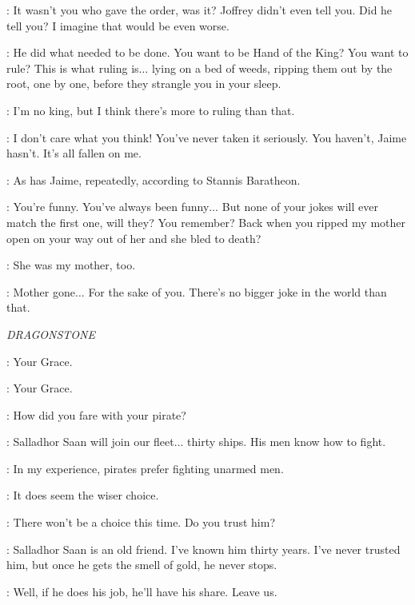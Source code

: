
\TYRION: It wasn't you who gave the order, was it? Joffrey didn't even tell you. Did he tell you? I imagine that would be even worse.

\CERSEI: He did what needed to be done. You want to be Hand of the King? You want to rule? This is what ruling is$\ldots$ lying on a bed of weeds, ripping them out by the root, one by one, before they strangle you in your sleep.

\TYRION: I'm no king, but I think there's more to ruling than that.

\CERSEI: I don't care what you think! You've never taken it seriously. You haven't, Jaime hasn't. It's all fallen on me.

\TYRION: As has Jaime, repeatedly, according to Stannis Baratheon.

\CERSEI: You're funny. You've always been funny$\ldots$ But none of your jokes will ever match the first one, will they? You remember? Back when you ripped my mother open on your way out of her and she bled to death?

\TYRION: She was my mother, too.

\CERSEI: Mother gone$\ldots$ For the sake of you. There's no bigger joke in the world than that.



\scene

\textit{DRAGONSTONE}


\DAVOS: Your Grace.

\MATTHOS: Your Grace.

\STANNIS: How did you fare with your pirate?

\DAVOS: Salladhor Saan will join our fleet$\ldots$ thirty ships. His men know how to fight.

\STANNIS: In my experience, pirates prefer fighting unarmed men.

\DAVOS: It does seem the wiser choice.

\STANNIS: There won't be a choice this time. Do you trust him?

\DAVOS: Salladhor Saan is an old friend. I've known him thirty years. I've never trusted him, but once he gets the smell of gold, he never stops.

\STANNIS: Well, if he does his job, he'll have his share. Leave us.

